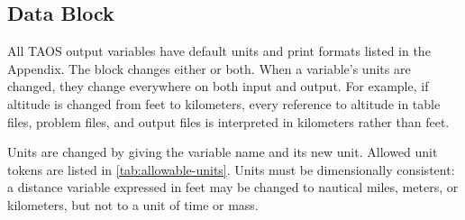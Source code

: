\subsection{ Data Block}\label{sec:block-units-fmt}

All TAOS output variables have default units and print formats listed in the
Appendix. The  block changes either or both. When a
variable's units are changed, they change everywhere on both input and output. For
example, if altitude is changed from feet to kilometers, every reference to altitude
in table files, problem files, and output files is interpreted in kilometers rather than
feet.


Units are changed by giving the variable name and its new unit. Allowed unit tokens
are listed in \cref{tab:allowable-units}. Units must be dimensionally consistent:
a distance variable expressed in feet may be changed to nautical miles, meters, or
kilometers, but not to a unit of time or mass.

